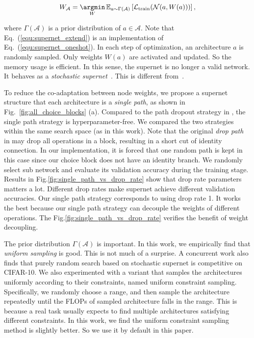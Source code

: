 \begin{equation}
    W_\mathcal{A} = \mathop{\argmin}_{W} \mathbb{E}_{a \sim \Gamma(\mathcal{A})} \left[ \mathcal{L}_\text{train}(\mathcal{N}(a, W(a))) \right],
\label{equ:supernet_extend}
\end{equation}

where $\Gamma(\mathcal{A})$ is a prior distribution of $a\in\mathcal{A}$. Note that Eq.~(\ref{equ:supernet_extend}) is an implementation of Eq.~(\ref{equ:supernet_oneshot}). In each step of optimization, an architecture $a$ is randomly sampled. Only weights $W(a)$ are activated and updated. So the memory usage is efficient. In this sense, the supernet is no longer a valid network. It behaves as a \emph{stochastic supernet}~\cite{veniat2018learning}. This is different from~\cite{bender2018understanding}.

To reduce the co-adaptation between node weights, we propose a supernet structure that each architecture is a \emph{single path}, as shown in Fig.~\ref{fig:all_choice_blocks} (a). Compared to the path dropout strategy in \cite{bender2018understanding}, the single path strategy is hyperparameter-free. We compared the two strategies within the same search space (as in this work). Note that the original \emph{drop path} in \cite{bender2018understanding} may drop all operations in a block, resulting in a short cut of identity connection. In our implementation, it is forced that one random path is kept in this case since our choice block does not have an identity branch. We randomly select sub network and evaluate its validation accuracy during the training stage. Results in Fig.\ref{fig:single_path_vs_drop_rate} show that drop rate parameters matters a lot. Different drop rates make supernet achieve different validation accuracies. Our single path strategy corresponds to using drop rate 1. It works the best because our single path strategy can decouple the weights of different operations. The Fig.\ref{fig:single_path_vs_drop_rate} verifies the benefit of weight decoupling.

The prior distribution $\Gamma(\mathcal{A})$ is important. In this work, we empirically find that \emph{uniform sampling} is good. This is not much of a surprise. A concurrent work \cite{li2019random} also finds that purely random search based on stochastic supernet is competitive on CIFAR-10. We also experimented with a variant that samples the architectures uniformly according to their constraints, named uniform constraint sampling. Specifically, we randomly choose a range, and then sample the architecture repeatedly until the FLOPs of sampled architecture falls in the range. This is because a real task usually expects to find multiple architectures satisfying different constraints. In this work, we find the uniform constraint sampling method is slightly better. So we use it by default in this paper.

